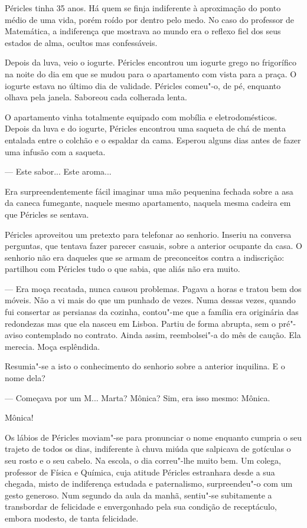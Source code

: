 Péricles tinha 35 anos. Há quem se finja indiferente à aproximação do
ponto médio de uma vida, porém roído por dentro pelo medo. No caso do
professor de Matemática, a indiferença que mostrava ao mundo era o
reflexo fiel dos seus estados de alma, ocultos mas confessáveis.

Depois da luva, veio o iogurte. Péricles encontrou um iogurte grego no
frigorífico na noite do dia em que se mudou para o apartamento com vista
para a praça. O iogurte estava no último dia de validade. Péricles
comeu"-o, de pé, enquanto olhava pela janela. Saboreou cada colherada
lenta.

O apartamento vinha totalmente equipado com mobília e eletrodomésticos.
Depois da luva e do iogurte, Péricles encontrou uma saqueta de chá de
menta entalada entre o colchão e o espaldar da cama. Esperou alguns dias
antes de fazer uma infusão com a saqueta.

--- Este sabor... Este aroma...

Era surpreendentemente fácil imaginar uma mão pequenina fechada sobre
a asa da caneca fumegante, naquele mesmo apartamento, naquela mesma
cadeira em que Péricles se sentava.

Péricles aproveitou um pretexto para telefonar ao senhorio. Inseriu na
conversa perguntas, que tentava fazer parecer casuais, sobre a anterior
ocupante da casa. O senhorio não era daqueles que se armam de
preconceitos contra a indiscrição: partilhou com Péricles tudo o que
sabia, que aliás não era muito.

--- Era moça recatada, nunca causou problemas. Pagava a horas e tratou bem
  dos móveis. Não a vi mais do que um punhado de vezes. Numa dessas
  vezes, quando fui consertar as persianas da cozinha, contou"-me que a
  família era originária das redondezas mas que ela nasceu em Lisboa.
  Partiu de forma abrupta, sem o pré"-aviso contemplado no contrato.
  Ainda assim, reembolsei"-a do mês de caução. Ela merecia. Moça esplêndida.

Resumia"-se a isto o conhecimento do senhorio sobre a anterior
inquilina. E o nome dela?

--- Começava por um M... Marta? Mônica? Sim, era isso mesmo: Mônica.


Mônica!

Os lábios de Péricles moviam"-se para pronunciar o nome enquanto cumpria
o seu trajeto de todos os dias, indiferente à chuva miúda que salpicava
de gotículas o seu rosto e o seu cabelo. Na escola, o dia correu"-lhe
muito bem. Um colega, professor de Física e Química, cuja atitude
Péricles estranhara desde a sua chegada, misto de indiferença estudada e
paternalismo, surpreendeu"-o com um gesto generoso. Num segundo da aula
da manhã, sentiu"-se subitamente a transbordar de felicidade e envergonhado pela sua condição de receptáculo, embora
modesto, de tanta felicidade.

